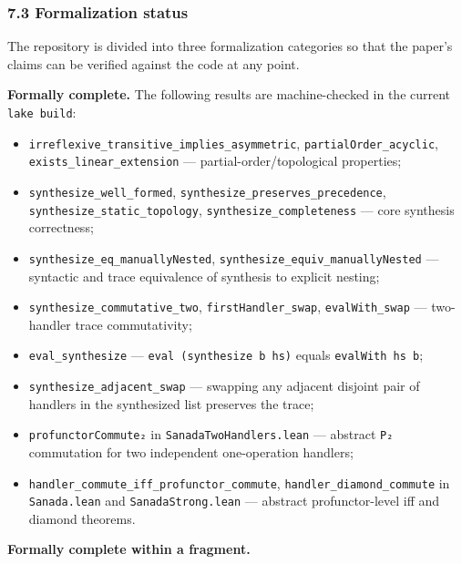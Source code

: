 \documentclass[
  11pt,
]{article}
\providecommand{\tightlist}{%
  \setlength{\itemsep}{0pt}\setlength{\parskip}{0pt}}
\begin{document}
\subsubsection{7.3 Formalization status}\label{formalization-status}

The repository is divided into three formalization categories so that
the paper's claims can be verified against the code at any point.

\textbf{Formally complete.} The following results are machine-checked in
the current \texttt{lake\ build}:

\begin{itemize}
\tightlist
\item
  \texttt{irreflexive\_transitive\_implies\_asymmetric},
  \texttt{partialOrder\_acyclic}, \texttt{exists\_linear\_extension} ---
  partial-order/topological properties;
\item
  \texttt{synthesize\_well\_formed},
  \texttt{synthesize\_preserves\_precedence},
  \texttt{synthesize\_static\_topology},
  \texttt{synthesize\_completeness} --- core synthesis correctness;
\item
  \texttt{synthesize\_eq\_manuallyNested},
  \texttt{synthesize\_equiv\_manuallyNested} --- syntactic and trace
  equivalence of synthesis to explicit nesting;
\item
  \texttt{synthesize\_commutative\_two}, \texttt{firstHandler\_swap},
  \texttt{evalWith\_swap} --- two-handler trace commutativity;
\item
  \texttt{eval\_synthesize} --- \texttt{eval\ (synthesize\ b\ hs)}
  equals \texttt{evalWith\ hs\ b};
\item
  \texttt{synthesize\_adjacent\_swap} --- swapping any adjacent disjoint
  pair of handlers in the synthesized list preserves the trace;
\item
  \texttt{profunctorCommute₂} in \texttt{SanadaTwoHandlers.lean} ---
  abstract \texttt{P₂} commutation for two independent one-operation
  handlers;
\item
  \texttt{handler\_commute\_iff\_profunctor\_commute},
  \texttt{handler\_diamond\_commute} in \texttt{Sanada.lean} and
  \texttt{SanadaStrong.lean} --- abstract profunctor-level iff and
  diamond theorems.
\end{itemize}

\textbf{Formally complete within a fragment.}
\end{document}
